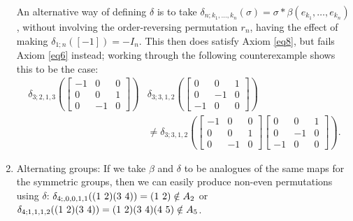 \begin{example}
\begin{enumerate}
An alternative way of defining $\delta$ is to take $\delta_{n;k_1,\ldots,k_n}(\sigma) = \sigma \ast \beta(e_{k_1},\ldots,e_{k_n})$, without involving the order-reversing permutation $r_n$, having the effect of making $\delta_{1;n}([-1]) = -I_n$. This then does satisfy Axiom \ref{eq8}, but fails Axiom \ref{eq6} instead; working through the following counterexample shows this to be the case:
  \begin{align*}
    \delta_{3;2,1,3}\left(
    \begin{bmatrix}
    -1 & 0 & 0 \\
    0 & 0 & 1 \\
    0 & -1 & 0
    \end{bmatrix}
    \right)
    &\delta_{3;3,1,2}\left(
    \begin{bmatrix}
    0 & 0 & 1 \\
    0 & -1 & 0 \\
    -1 & 0 & 0
    \end{bmatrix}
    \right)\\
    &\neq
    \delta_{3;3,1,2}\left(
    \begin{bmatrix}
    -1 & 0 & 0 \\
    0 & 0 & 1 \\
    0 & -1 & 0
    \end{bmatrix}
    \begin{bmatrix}
    0 & 0 & 1 \\
    0 & -1 & 0 \\
    -1 & 0 & 0
    \end{bmatrix}
    \right).
  \end{align*}
\item Alternating groups: If we take $\beta$ and $\delta$ to be analogues of the same maps for the symmetric groups, then we can easily produce non-even permutations using $\delta$: $\delta_{4;,0,0,1,1}(( 1 \, \, 2 )( 3 \, \, 4 ))=( 1 \, \, 2 ) \notin A_2$ or $\delta_{4;1,1,1,2}(( 1 \, \, 2 )( 3 \, \, 4 )) = ( 1 \, \, 2 )( 3 \, \, 4 )( 4 \, \, 5 ) \notin A_5$.
\end{enumerate}
\end{example}

